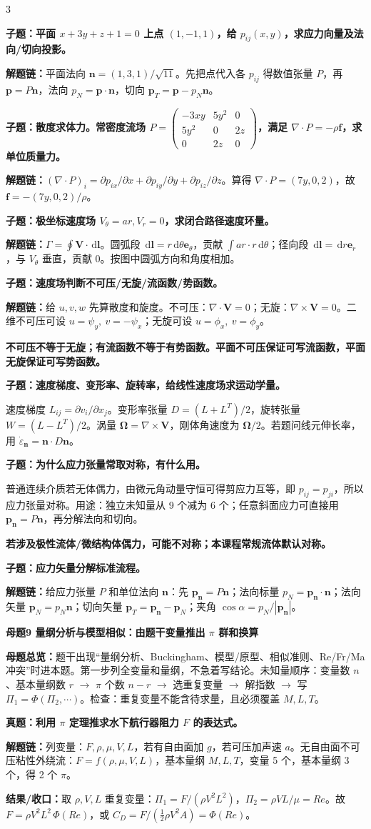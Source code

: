 \documentclass[a4paper]{article}
\newcommand{\mt}[1]{\vspace{0.45pt}\colorbox{M}{\parbox{\dimexpr\linewidth-2\fboxsep}{\color{white}\bfseries #1}}\par}
\newcommand{\qt}[1]{\vspace{0.25pt}\colorbox{Q}{\parbox{\dimexpr\linewidth-2\fboxsep}{\color{white}\bfseries #1}}\par}
\newcommand{\ans}[1]{\colorbox{G}{\parbox{\dimexpr\linewidth-2\fboxsep}{#1}}\par}
\newcommand{\warn}[1]{\colorbox{Y}{\parbox{\dimexpr\linewidth-2\fboxsep}{\color{E}\bfseries #1}}\par}
\newcommand{\chain}[1]{{\color{A}\bfseries 解题链：}#1\par}
\newcommand{\res}[1]{{\color{E}\bfseries 结果/收口：}#1\par}
\newcommand{\dd}{\,\mathrm d}
\newcommand{\mview}[1]{\ans{\textbf{母题总览：}#1}}
\begin{document}
\begin{multicols}{3}
\qt{子题：平面 $x+3y+z+1=0$ 上点 $(1,-1,1)$，给 $p_{ij}(x,y)$，求应力向量及法向/切向投影。}
\chain{平面法向 $\bm n=(1,3,1)/\sqrt{11}$。先把点代入各 $p_{ij}$ 得数值张量 $P$，再 $\bm p=P\bm n$，法向 $p_N=\bm p\cdot\bm n$，切向 $\bm p_T=\bm p-p_N\bm n$。}

\qt{子题：散度求体力。常密度流场 $P=\begin{pmatrix}-3xy&5y^2&0\\5y^2&0&2z\\0&2z&0\end{pmatrix}$，满足 $\nabla\cdot P=-\rho\bm f$，求单位质量力。}
\chain{$(\nabla\cdot P)_i=\partial p_{ix}/\partial x+\partial p_{iy}/\partial y+\partial p_{iz}/\partial z$。算得 $\nabla\cdot P=(7y,0,2)$，故 $\bm f=-(7y,0,2)/\rho$。}

\qt{子题：极坐标速度场 $V_\theta=ar,V_r=0$，求闭合路径速度环量。}
\chain{$\Gamma=\oint\bm V\cdot\dd\bm l$。圆弧段 $\dd\bm l=r\dd\theta\bm e_\theta$，贡献 $\int ar\cdot r\dd\theta$；径向段 $\dd\bm l=\dd r\bm e_r$，与 $V_\theta$ 垂直，贡献 0。按图中圆弧方向和角度相加。}

\qt{子题：速度场判断不可压/无旋/流函数/势函数。}
\chain{给 $u,v,w$ 先算散度和旋度。不可压：$\nabla\cdot\bm V=0$；无旋：$\nabla\times\bm V=0$。二维不可压可设 $u=\psi_y,\ v=-\psi_x$；无旋可设 $u=\phi_x,\ v=\phi_y$。}
\warn{不可压不等于无旋；有流函数不等于有势函数。平面不可压保证可写流函数，平面无旋保证可写势函数。}

\qt{子题：速度梯度、变形率、旋转率，给线性速度场求运动学量。}
\ans{速度梯度 $L_{ij}=\partial v_i/\partial x_j$。变形率张量 $D=(L+L^T)/2$，旋转张量 $W=(L-L^T)/2$。涡量 $\bm\Omega=\nabla\times\bm V$，刚体角速度为 $\bm\Omega/2$。若题问线元伸长率，用 $\dot\varepsilon_{\bm n}=\bm n\cdot D\bm n$。}

\qt{子题：为什么应力张量常取对称，有什么用。}
\ans{普通连续介质若无体偶力，由微元角动量守恒可得剪应力互等，即 $p_{ij}=p_{ji}$，所以应力张量对称。用途：独立未知量从 9 个减为 6 个；任意斜面应力可直接用 $\bm p_{\bm n}=P\bm n$，再分解法向和切向。}
\warn{若涉及极性流体/微结构体偶力，可能不对称；本课程常规流体默认对称。}

\qt{子题：应力矢量分解标准流程。}
\chain{给应力张量 $P$ 和单位法向 $\bm n$：先 $\bm p_{\bm n}=P\bm n$；法向标量 $p_N=\bm p_{\bm n}\cdot\bm n$；法向矢量 $\bm p_N=p_N\bm n$；切向矢量 $\bm p_T=\bm p_{\bm n}-\bm p_N$；夹角 $\cos\alpha=p_N/|\bm p_{\bm n}|$。}


\mt{母题9 量纲分析与模型相似：由题干变量推出 $\pi$ 群和换算}
\mview{题干出现“量纲分析、Buckingham、模型/原型、相似准则、Re/Fr/Ma 冲突”时进本题。第一步列全变量和量纲，不急着写结论。未知量顺序：变量数 $n$、基本量纲数 $r$ $\to$ $\pi$ 个数 $n-r$ $\to$ 选重复变量 $\to$ 解指数 $\to$ 写 $\Pi_1=\Phi(\Pi_2,\cdots)$。检查：重复变量不能含待求量，且必须覆盖 $M,L,T$。}
\qt{真题：利用 $\pi$ 定理推求水下航行器阻力 $F$ 的表达式。}
\chain{列变量：$F,\rho,\mu,V,L$，若有自由面加 $g$，若可压加声速 $a$。无自由面不可压粘性外绕流：$F=f(\rho,\mu,V,L)$，基本量纲 $M,L,T$，变量 5 个，基本量纲 3 个，得 2 个 $\pi$。}
\res{取 $\rho,V,L$ 重复变量：$\Pi_1=F/(\rho V^2L^2)$，$\Pi_2=\rho VL/\mu=Re$。故 $F=\rho V^2L^2\,\Phi(Re)$，或 $C_D=F/(\frac12\rho V^2A)=\Phi(Re)$。}


\end{multicols}
\end{document}
